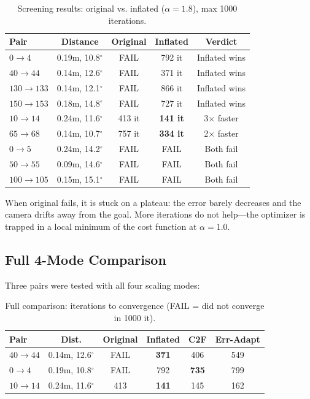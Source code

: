 \documentclass[11pt]{article}
\begin{document}
\begin{table}[h!]
\centering
\caption{Screening results: original vs. inflated ($\alpha=1.8$), max 1000 iterations.}
\label{tab:screening}
\begin{tabular}{lcccc}
\toprule
\textbf{Pair} & \textbf{Distance} & \textbf{Original} & \textbf{Inflated} & \textbf{Verdict} \\
\midrule
$0 \to 4$     & 0.19m, 10.8$^\circ$ & FAIL      & 792 it   & Inflated wins \\
$40 \to 44$   & 0.14m, 12.6$^\circ$ & FAIL      & 371 it   & Inflated wins \\
$130 \to 133$ & 0.14m, 12.1$^\circ$ & FAIL      & 866 it   & Inflated wins \\
$150 \to 153$ & 0.18m, 14.8$^\circ$ & FAIL      & 727 it   & Inflated wins \\
\midrule
$10 \to 14$   & 0.24m, 11.6$^\circ$ & 413 it    & \textbf{141 it}   & 3$\times$ faster \\
$65 \to 68$   & 0.14m, 10.7$^\circ$ & 757 it    & \textbf{334 it}   & 2$\times$ faster \\
\midrule
$0 \to 5$     & 0.24m, 14.2$^\circ$ & FAIL      & FAIL     & Both fail \\
$50 \to 55$   & 0.09m, 14.6$^\circ$ & FAIL      & FAIL     & Both fail \\
$100 \to 105$ & 0.15m, 15.1$^\circ$ & FAIL      & FAIL     & Both fail \\
\bottomrule
\end{tabular}
\end{table}

When original fails, it is stuck on a plateau: the error barely decreases and the camera drifts away from the goal. More iterations do not help---the optimizer is trapped in a local minimum of the cost function at $\alpha=1.0$.

\subsection{Full 4-Mode Comparison}

Three pairs were tested with all four scaling modes:

\begin{table}[h!]
\centering
\caption{Full comparison: iterations to convergence (FAIL = did not converge in 1000 it).}
\label{tab:full_comparison}
\begin{tabular}{lccccc}
\toprule
\textbf{Pair} & \textbf{Dist.} & \textbf{Original} & \textbf{Inflated} & \textbf{C2F} & \textbf{Err-Adapt} \\
\midrule
$40 \to 44$ & 0.14m, 12.6$^\circ$ & FAIL & \textbf{371} & 406 & 549 \\
$0 \to 4$   & 0.19m, 10.8$^\circ$ & FAIL & 792 & \textbf{735} & 799 \\
$10 \to 14$ & 0.24m, 11.6$^\circ$ & 413  & \textbf{141} & 145 & 162 \\
\bottomrule
\end{tabular}
\end{table}
\end{document}
